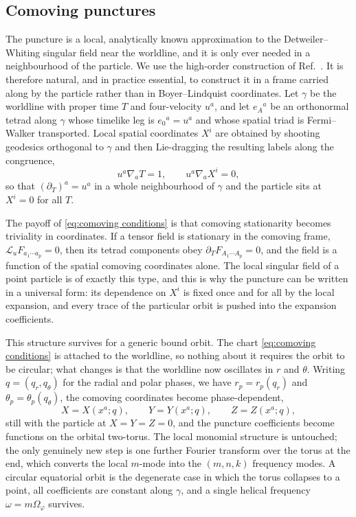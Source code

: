 \documentclass[%
reprint,
 prd,
superscriptaddress,
nofootinbib,
aps,
dvipsnames
]{revtex4-2}
\newcommand{\Lie}{{\mathcal L}}
\newcommand{\emm}{m}
\begin{document}
\subsection{Comoving punctures}
\label{sec:comoving punctures}

The puncture is a local, analytically known approximation to the
Detweiler--Whiting singular field near the worldline, and it is only ever
needed in a neighbourhood of the particle. We use the high-order construction
of Ref.~\cite{Bourg:2024cgh}. It is therefore natural, and in practice
essential, to construct it in a frame carried along by the particle rather
than in Boyer--Lindquist coordinates. Let $\gamma$ be the worldline with
proper time $T$ and four-velocity $u^{a}$, and let $e_{A}{}^{a}$ be an
orthonormal tetrad along $\gamma$ whose timelike leg is $e_{0}{}^{a}=u^{a}$
and whose spatial triad is Fermi--Walker transported. Local spatial
coordinates $X^{i}$ are obtained by shooting geodesics orthogonal to
$\gamma$ and then Lie-dragging the resulting labels along the congruence,
\begin{equation}\label{eq:comoving conditions}
  u^{a}\nabla_{a}T = 1,
  \qquad
  u^{a}\nabla_{a}X^{i} = 0,
\end{equation}
so that $(\partial_{T})^{a}=u^{a}$ in a whole neighbourhood of $\gamma$ and
the particle sits at $X^{i}=0$ for all $T$.

The payoff of \eqref{eq:comoving conditions} is that comoving stationarity
becomes triviality in coordinates. If a tensor field is stationary in the
comoving frame, $\Lie_{u}F_{a_{1}\cdots a_{p}}=0$, then its tetrad components
obey $\partial_{T}F_{A_{1}\cdots A_{p}}=0$, and the field is a function of the
spatial comoving coordinates alone. The local singular field of a point
particle is of exactly this type, and this is why the puncture can be written
in a universal form: its dependence on $X^{i}$ is fixed once and for all by
the local expansion, and every trace of the particular orbit is pushed into
the expansion coefficients.

This structure survives for a generic bound orbit. The chart
\eqref{eq:comoving conditions} is attached to the worldline, so nothing about
it requires the orbit to be circular; what changes is that the worldline now
oscillates in $r$ and $\theta$. Writing $q=(q_{r},q_{\theta})$ for the radial
and polar phases, we have $r_{p}=r_{p}(q_{r})$ and
$\theta_{p}=\theta_{p}(q_{\theta})$, the comoving coordinates become
phase-dependent,
\begin{equation}\label{eq:comoving generic}
  X = X(x^{a};q),
  \qquad
  Y = Y(x^{a};q),
  \qquad
  Z = Z(x^{a};q),
\end{equation}
still with the particle at $X=Y=Z=0$, and the puncture coefficients become
functions on the orbital two-torus. The local monomial structure is
untouched; the only genuinely new step is one further Fourier transform over
the torus at the end, which converts the local $\emm$-mode into the
$(\emm,n,k)$ frequency modes. A circular equatorial orbit is the degenerate
case in which the torus collapses to a point, all coefficients are constant
along $\gamma$, and a single helical frequency $\omega=\emm\Omega_\varphi$
survives.
\end{document}
